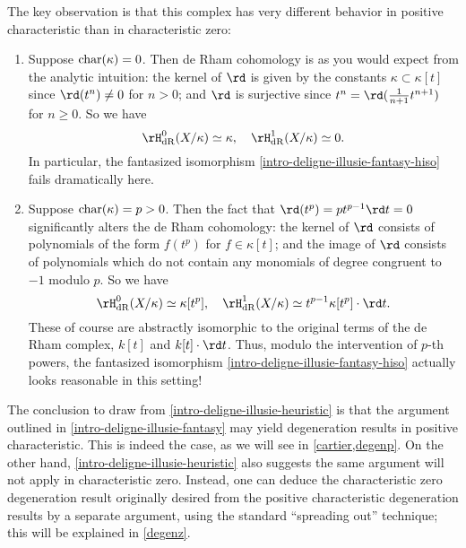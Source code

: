\begin{nothing}
\begin{subheuristic}
    The key observation is that this complex has very different behavior in positive characteristic than in characteristic zero:
    \begin{enumerate}
    \item \label{intro-deligne-illusie-heuristic-z} Suppose $\operatorname{char}(\kappa) = 0$. Then de Rham cohomology is as you would expect from the analytic intuition: the kernel of $\rd$ is given by the constants $\kappa \subset \kappa[t]$ since $\rd(t^n) \ne 0$ for $n > 0$; and $\rd$ is surjective since $t^n = \rd(\frac{1}{n+1}t^{n+1})$ for $n \ge 0$. So we have
      \[
        \rH_\dR^0(X/\kappa) \iso \kappa, \quad
        \rH_\dR^1(X/\kappa) \iso 0.
      \]
      In particular, the fantasized isomorphism \cref{intro-deligne-illusie-fantasy-hiso} fails dramatically here.

    \item \label{intro-deligne-illusie-heuristic-p} Suppose $\operatorname{char}(\kappa) = p > 0$. Then the fact that $\rd(t^p) = pt^{p-1}\rd t = 0$ significantly alters the de Rham cohomology: the kernel of $\rd$ consists of polynomials of the form $f(t^p)$ for $f \in \kappa[t]$; and the image of $\rd$ consists of polynomials which do not contain any monomials of degree congruent to $-1$ modulo $p$. So we have
      \[
        \rH_\dR^0(X/\kappa) \iso \kappa[t^p], \quad
        \rH_\dR^1(X/\kappa) \iso t^{p-1}\kappa[t^p] \cdot \rd t.
      \]
      These of course are abstractly isomorphic to the original terms of the de Rham complex, $k[t]$ and $k[t] \cdot \rd t$. Thus, modulo the intervention of $p$-th powers, the fantasized isomorphism \cref{intro-deligne-illusie-fantasy-hiso} actually looks reasonable in this setting!
    \end{enumerate}
  \end{subheuristic}
\end{nothing}

The conclusion to draw from \cref{intro-deligne-illusie-heuristic} is that the argument outlined in \cref{intro-deligne-illusie-fantasy} may yield degeneration results in positive characteristic. This is indeed the case, as we will see in \cref{cartier,degenp}. On the other hand, \cref{intro-deligne-illusie-heuristic} also suggests the same argument will not apply in characteristic zero. Instead, one can deduce the characteristic zero degeneration result originally desired from the positive characteristic degeneration results by a separate argument, using the standard ``spreading out'' technique; this will be explained in \cref{degenz}.

